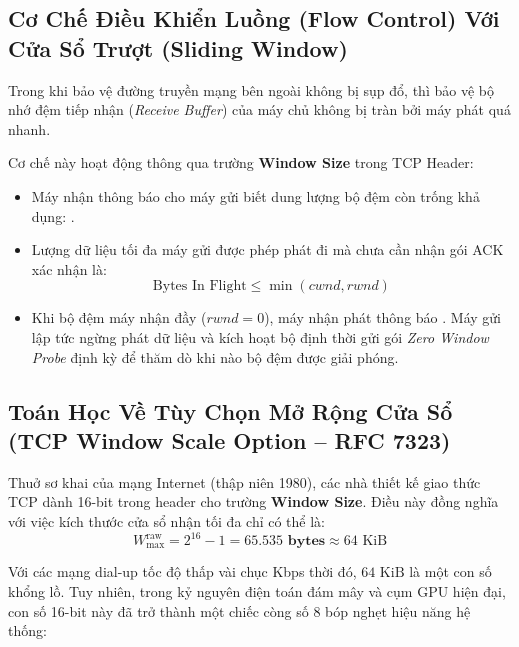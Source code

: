 \subsection{Cơ Chế Điều Khiển Luồng (Flow Control) Với Cửa Sổ Trượt (Sliding Window)}
Trong khi  bảo vệ đường truyền mạng bên ngoài không bị sụp đổ, thì  bảo vệ bộ nhớ đệm tiếp nhận (\textit{Receive Buffer}) của máy chủ không bị tràn bởi máy phát quá nhanh.

Cơ chế này hoạt động thông qua trường \textbf{Window Size} trong TCP Header:
\begin{itemize}
  \item Máy nhận thông báo cho máy gửi biết dung lượng bộ đệm còn trống khả dụng: .
  \item Lượng dữ liệu tối đa máy gửi được phép phát đi mà chưa cần nhận gói ACK xác nhận là:
  \begin{equation}
  \text{Bytes In Flight} \le \min(cwnd, rwnd)
  \end{equation}
  \item Khi bộ đệm máy nhận đầy ($rwnd = 0$), máy nhận phát thông báo . Máy gửi lập tức ngừng phát dữ liệu và kích hoạt bộ định thời gửi gói \textit{Zero Window Probe} định kỳ để thăm dò khi nào bộ đệm được giải phóng.
\end{itemize}

\subsection{Toán Học Về Tùy Chọn Mở Rộng Cửa Sổ (TCP Window Scale Option -- RFC 7323)}
\label{subsec:tcp-window-scale-math}
Thuở sơ khai của mạng Internet (thập niên 1980), các nhà thiết kế giao thức TCP dành 16-bit trong header cho trường \textbf{Window Size}. Điều này đồng nghĩa với việc kích thước cửa sổ nhận tối đa chỉ có thể là:
\begin{equation}
W_{\max}^{\text{raw}} = 2^{16} - 1 = \mathbf{65.535 \text{ bytes}} \approx 64 \text{ KiB}
\end{equation}

Với các mạng dial-up tốc độ thấp vài chục Kbps thời đó, $64\text{ KiB}$ là một con số khổng lồ. Tuy nhiên, trong kỷ nguyên điện toán đám mây và cụm GPU hiện đại, con số 16-bit này đã trở thành một chiếc còng số 8 bóp nghẹt hiệu năng hệ thống:

